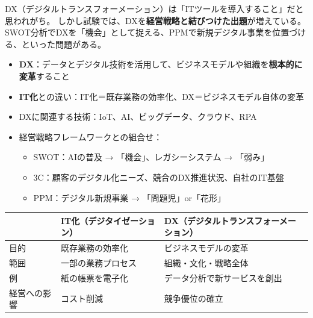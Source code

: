 
\mondaipage
{}

\begin{stumble}
DX（デジタルトランスフォーメーション）は「ITツールを導入すること」だと思われがち。
しかし試験では、DXを\textbf{経営戦略と結びつけた出題}が増えている。
SWOT分析でDXを「機会」として捉える、PPMで新規デジタル事業を位置づける、といった問題がある。
\end{stumble}

\begin{keypoint}
\begin{itemize}
  \item \textbf{DX}：データとデジタル技術を活用して、ビジネスモデルや組織を\textbf{根本的に変革}すること
  \item \textbf{IT化}との違い：IT化＝既存業務の効率化、DX＝ビジネスモデル自体の変革
  \item DXに関連する技術：IoT、AI、ビッグデータ、クラウド、RPA
  \item 経営戦略フレームワークとの組合せ：
    \begin{itemize}
      \item SWOT：AIの普及 → 「機会」、レガシーシステム → 「弱み」
      \item 3C：顧客のデジタル化ニーズ、競合のDX推進状況、自社のIT基盤
      \item PPM：デジタル新規事業 → 「問題児」or「花形」
    \end{itemize}
\end{itemize}
\end{keypoint}

\begin{comparison}
\begin{tabularx}{\textwidth}{lXX}
  \toprule
  & \textbf{IT化（デジタイゼーション）} & \textbf{DX（デジタルトランスフォーメーション）} \\
  \midrule
  目的 & 既存業務の効率化 & ビジネスモデルの変革 \\
  範囲 & 一部の業務プロセス & 組織・文化・戦略全体 \\
  例 & 紙の帳票を電子化 & データ分析で新サービスを創出 \\
  経営への影響 & コスト削減 & 競争優位の確立 \\
  \bottomrule
\end{tabularx}
\end{comparison}

